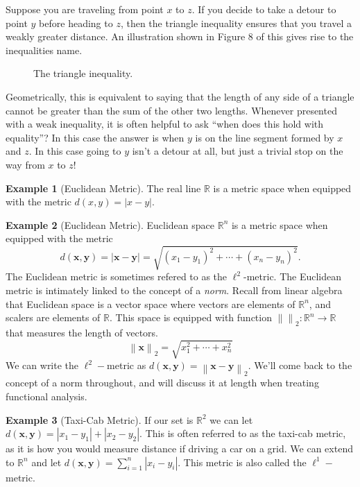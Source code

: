 \documentclass{article}
\newcommand{\R}{\mathbb{R}}
\newcommand{\x}{\mathbf{x}}
\newcommand{\y}{\mathbf{y}}
\newcommand{\norm}[1]{\left\lVert#1\right\rVert}
\theoremstyle{definition}
\newtheorem{example}{Example}[section]
\begin{document}
Suppose you are traveling from point $ x $ to $ z $. If you decide to take a detour to point $ y $ before heading to $ z $, then the triangle inequality ensures that you travel a weakly greater distance. An illustration shown in Figure 8 of this gives rise to the inequalities name.
\begin{figure}[h!]
	\centering
	\caption{The triangle inequality.}
\end{figure}  
Geometrically, this is equivalent to saying that the length of any side of a triangle cannot be greater than the sum of the other two lengths. Whenever presented with a weak inequality, it is often helpful to ask ``when does this hold with equality''? In this case the answer is when $ y $ is on the line segment formed by $ x $ and $ z $. In this case going to $ y $ isn't a detour at all, but just a trivial stop on the way from $ x $ to $ z $! 
\begin{example}[Euclidean Metric]
The real line $ \R $ is a metric space when equipped with the metric $ d(x,y)=|x-y| $. 
\end{example}
\begin{example}[Euclidean Metric]
Euclidean space $ \R^n $ is a metric space when equipped with the metric $$ d(\mathbf{x},\mathbf{y})=|\x-\y|=\sqrt{(x_1-y_1)^2+\cdots+(x_n-y_n)^2} .$$ The Euclidean metric is sometimes refered to as the $ \ell^2 $-metric. The Euclidean metric is intimately linked to the concept of a \textit{\color{red}norm}. Recall from linear algebra that Euclidean space is a vector space where vectors are elements of $ \R^n $, and scalers are elements of $ \R $. This space is equipped with function $ \norm{}_2:\R^n\to\R $ that measures the length of vectors. $$ \norm{\x}_2=\sqrt{x_1^2+\cdots+x_n^2}$$ We can write the $ \ell^2 -$metric as $ d(\x,\y)=\norm{\x-\y}_2 $. We'll come back to the concept of a norm throughout, and will discuss it at length when treating functional analysis.
\end{example}
\begin{example}[Taxi-Cab Metric]
If our set is $ \R^2 $ we can let $ d(\mathbf{x},\mathbf{y})=|x_1-y_1|+|x_2-y_2| $. This is often referred to as the taxi-cab metric, as it is how you would measure distance if driving a car on a grid. We can extend to $ \R^n $ and let $ d(\mathbf{x},\mathbf{y})=\sum_{i=1}^{n}|x_i-y_i| $. This metric is also called the $ \ell^1 -$metric.    
\end{example}
\end{document}
